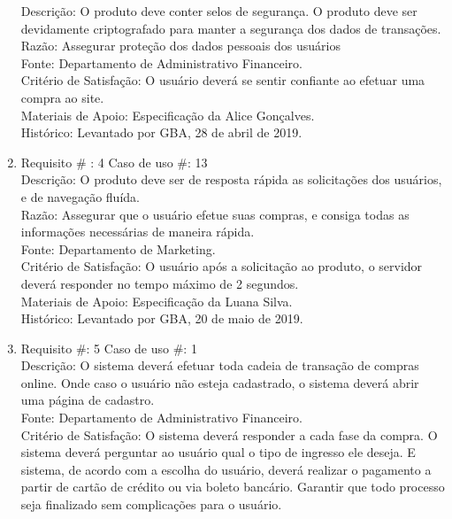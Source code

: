\documentclass[12pt]{article}
\begin{document}
\begin{enumerate}
                    Descrição: O produto deve conter selos de segurança. O produto deve ser devidamente criptografado para manter a segurança dos dados de transações. \\
                    Razão: Assegurar proteção dos dados pessoais dos usuários\\
                    Fonte: Departamento de Administrativo Financeiro.\\
                    Critério de Satisfação: O usuário deverá se sentir confiante ao efetuar uma compra ao site.\\
                    Materiais de Apoio: Especificação da Alice Gonçalves.\\
                    Histórico: Levantado por GBA, 28 de abril de 2019. \\
                \item Requisito \# : 4 Caso de uso \#: 13\\
                    Descrição: O produto deve ser de resposta rápida as solicitações dos usuários, e de navegação fluída. \\
                    Razão: Assegurar que o usuário efetue suas compras, e consiga todas as informações necessárias de maneira rápida. \\
                    Fonte: Departamento de Marketing.\\
                    Critério de Satisfação: O usuário após a solicitação ao produto, o servidor deverá responder no tempo máximo de 2 segundos. \\
                    Materiais de Apoio: Especificação da Luana Silva.\\
                    Histórico: Levantado por GBA, 20 de maio de 2019.\\
                \item Requisito \#: 5 Caso de uso \#: 1\\
                    Descrição: O sistema deverá efetuar toda cadeia de transação de compras online. Onde caso o usuário não esteja cadastrado, o sistema deverá abrir uma página de cadastro. \\
                    Fonte: Departamento de Administrativo Financeiro.\\
                    Critério de Satisfação: O sistema deverá responder a cada fase da compra. O sistema deverá perguntar ao usuário qual o tipo de ingresso ele deseja. E sistema, de acordo com a escolha do usuário, deverá realizar o pagamento a partir de cartão de crédito ou via boleto bancário. Garantir que todo processo seja finalizado sem complicações para o usuário. \\

\end{enumerate}
\end{document}
